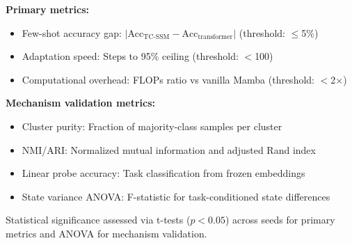 \textbf{Primary metrics:}
\begin{itemize}
\item Few-shot accuracy gap: $|\text{Acc}_{\text{TC-SSM}} - \text{Acc}_{\text{transformer}}|$ (threshold: $\leq$5\%)
\item Adaptation speed: Steps to 95\% ceiling (threshold: $<$100)
\item Computational overhead: FLOPs ratio vs vanilla Mamba (threshold: $<$2$\times$)
\end{itemize}

\textbf{Mechanism validation metrics:}
\begin{itemize}
\item Cluster purity: Fraction of majority-class samples per cluster
\item NMI/ARI: Normalized mutual information and adjusted Rand index
\item Linear probe accuracy: Task classification from frozen embeddings
\item State variance ANOVA: F-statistic for task-conditioned state differences
\end{itemize}

Statistical significance assessed via t-tests ($p<0.05$) across seeds for primary metrics and ANOVA for mechanism validation.
